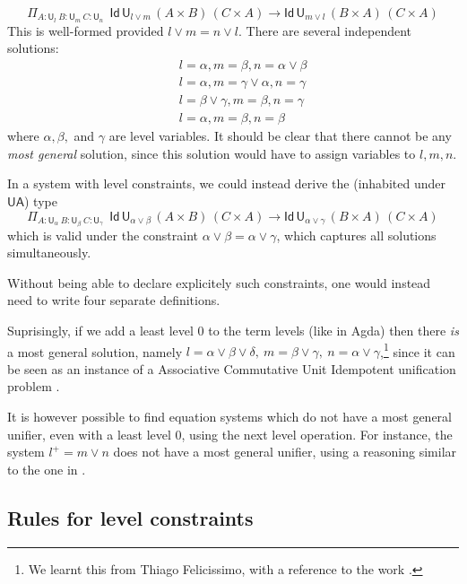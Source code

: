 \documentclass[11pt,a4paper]{article}
\theoremstyle{definition}
\newcommand{\Id}{\mathsf{Id}}
\newcommand{\UU}{\mathsf{U}}
\newcommand{\UA}{\mathsf{UA}}
\begin{document}
$$
    \Pi_{A:\UU_l~{B}:{\UU_m}~{C}:{\UU_n}}
    {~~\Id\,\UU_{l \vee m}\, (A\times B)\,(C \times A)
    \to \Id\,\UU_{m \vee l} \, (B\times A)\,(C \times A)}
$$
This is well-formed provided $l \vee m = n \vee l$.
There are several independent solutions:
\begin{eqnarray*}
&&l = \alpha, m = \beta, n = \alpha \vee \beta\\
&&l = \alpha, m = \gamma \vee \alpha, n = \gamma\\
&&l = \beta \vee \gamma, m = \beta, n = \gamma\\
&&l = \alpha, m = \beta, n = \beta
\end{eqnarray*}
where $\alpha, \beta,$ and $\gamma$ are level
variables. It should be clear that there cannot be any {\em most general} solution, since this solution would have to
assign variables to $l,m,n$.




In a system with level constraints,
we could instead derive the (inhabited under $\UA$) type
$$
    \Pi_{A:\UU_\alpha~{B}:{\UU_\beta}~{C}:{\UU_\gamma}}
    {~~\Id\,\UU_{\alpha \vee \beta}\, (A\times B)\,(C \times A)
    \to \Id\,\UU_{\alpha \vee \gamma}\, (B\times A)\,(C \times A)}
$$
which is valid under the constraint
$\alpha \vee \beta = \alpha \vee \gamma$,
which captures all solutions simultaneously.

Without being able to declare explicitely such constraints, %
one would instead need to write four separate definitions.

 Suprisingly, if we add a least level $0$ to the term levels (like in Agda) then there \emph{is} a most general solution,
 namely $l = \alpha\vee\beta\vee\delta,~m = \beta\vee\gamma,~n = \alpha\vee\gamma$,\footnote{We learnt this from
 Thiago Felicissimo, with a reference to the work \cite{FBB:impred2pred}.}
 since it can be seen as an instance of
 a Associative Commutative Unit Idempotent unification problem \cite{BaaderS94}.

 It is however possible to find equation systems which do not have a most general unifier, even with a least level $0$, using
 the next level operation. For instance, the system $l^+ = m\vee n$ does not have a most general unifier, using a reasoning
 similar to the one in \cite{FBB:impred2pred}.

\subsection*{Rules for level constraints}%
\end{document}
